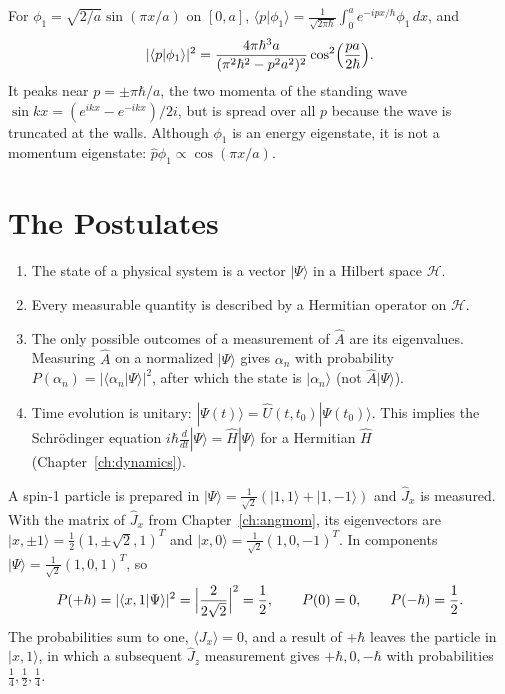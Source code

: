 \begin{example}
For $\phi_1 = \sqrt{2/a}\sin(\pi x/a)$ on $[0,a]$, $\langle p|\phi_1\rangle = \frac{1}{\sqrt{2\pi\hbar}}\int_0^ae^{-ipx/\hbar}\phi_1\,dx$, and
\[
    |\langle p|\phi_1\rangle|^2 = \frac{4\pi\hbar^3a}{(\pi^2\hbar^2 - p^2a^2)^2}\cos^2\Bigl(\frac{pa}{2\hbar}\Bigr).
\]
It peaks near $p = \pm\pi\hbar/a$, the two momenta of the standing wave $\sin kx = (e^{ikx}-e^{-ikx})/2i$, but is spread over all $p$ because the wave is truncated at the walls. Although $\phi_1$ is an energy eigenstate, it is not a momentum eigenstate: $\hat{p}\phi_1\propto\cos(\pi x/a)$.
\end{example}

\section{The Postulates}

\begin{fact}
\leavevmode
\begin{enumerate}
    \item The state of a physical system is a vector $|\Psi\rangle$ in a Hilbert space $\mathcal{H}$.
    \item Every measurable quantity is described by a Hermitian operator on $\mathcal{H}$.
    \item The only possible outcomes of a measurement of $\hat{A}$ are its eigenvalues. Measuring $\hat{A}$ on a normalized $|\Psi\rangle$ gives $\alpha_n$ with probability $P(\alpha_n) = |\langle\alpha_n|\Psi\rangle|^2$, after which the state is $|\alpha_n\rangle$ (not $\hat{A}|\Psi\rangle$).
    \item Time evolution is unitary: $|\Psi(t)\rangle = \hat{U}(t,t_0)|\Psi(t_0)\rangle$. This implies the Schr\"odinger equation $i\hbar\frac{d}{dt}|\Psi\rangle = \hat{H}|\Psi\rangle$ for a Hermitian $\hat{H}$ (Chapter~\ref{ch:dynamics}).
\end{enumerate}
\end{fact}

\begin{example}
A spin-1 particle is prepared in $|\Psi\rangle = \frac{1}{\sqrt2}(|1,1\rangle + |1,-1\rangle)$ and $\hat{J}_x$ is measured. With the matrix of $\hat{J}_x$ from Chapter~\ref{ch:angmom}, its eigenvectors are $|x,\pm1\rangle = \frac12(1,\pm\sqrt2,1)^T$ and $|x,0\rangle = \frac{1}{\sqrt2}(1,0,-1)^T$. In components $|\Psi\rangle = \frac{1}{\sqrt2}(1,0,1)^T$, so
\[
    P(+\hbar) = |\langle x,1|\Psi\rangle|^2 = \Bigl|\frac{2}{2\sqrt2}\Bigr|^2 = \frac12,
    \qquad
    P(0) = 0,
    \qquad
    P(-\hbar) = \frac12 .
\]
The probabilities sum to one, $\langle J_x\rangle = 0$, and a result of $+\hbar$ leaves the particle in $|x,1\rangle$, in which a subsequent $\hat{J}_z$ measurement gives $+\hbar,0,-\hbar$ with probabilities $\frac14,\frac12,\frac14$.
\end{example}

